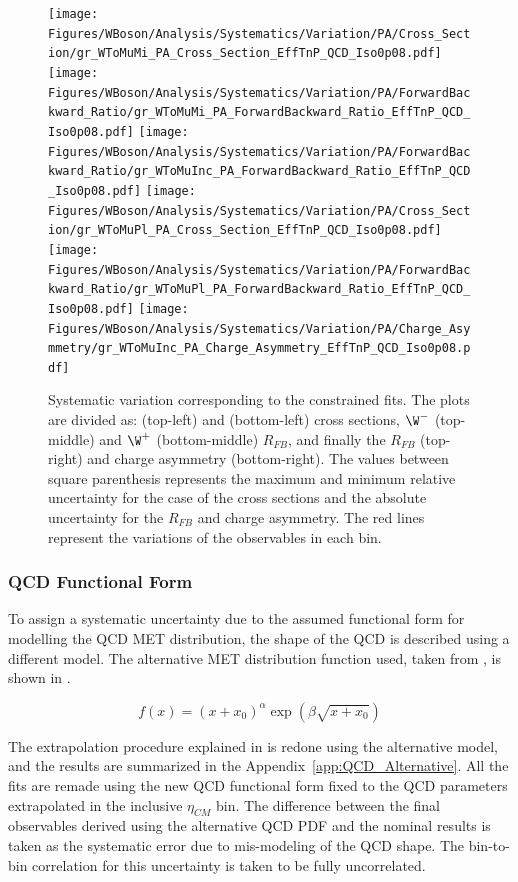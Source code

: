 \begin{figure}[htbp]
 \begin{center}
  \texttt{[image: Figures/WBoson/Analysis/Systematics/Variation/PA/Cross\_Section/gr\_WToMuMi\_PA\_Cross\_Section\_EffTnP\_QCD\_Iso0p08.pdf]}
  \texttt{[image: Figures/WBoson/Analysis/Systematics/Variation/PA/ForwardBackward\_Ratio/gr\_WToMuMi\_PA\_ForwardBackward\_Ratio\_EffTnP\_QCD\_Iso0p08.pdf]}
  \texttt{[image: Figures/WBoson/Analysis/Systematics/Variation/PA/ForwardBackward\_Ratio/gr\_WToMuInc\_PA\_ForwardBackward\_Ratio\_EffTnP\_QCD\_Iso0p08.pdf]}
  \texttt{[image: Figures/WBoson/Analysis/Systematics/Variation/PA/Cross\_Section/gr\_WToMuPl\_PA\_Cross\_Section\_EffTnP\_QCD\_Iso0p08.pdf]}
  \texttt{[image: Figures/WBoson/Analysis/Systematics/Variation/PA/ForwardBackward\_Ratio/gr\_WToMuPl\_PA\_ForwardBackward\_Ratio\_EffTnP\_QCD\_Iso0p08.pdf]}
  \texttt{[image: Figures/WBoson/Analysis/Systematics/Variation/PA/Charge\_Asymmetry/gr\_WToMuInc\_PA\_Charge\_Asymmetry\_EffTnP\_QCD\_Iso0p08.pdf]}
 \end{center}
 \caption{Systematic variation corresponding to the constrained fits. The plots are divided as: \WToMuNuMi (top-left) and \WToMuNuPl (bottom-left) cross sections, $\W^{-}$ (top-middle) and $\W^{+}$ (bottom-middle) $R_{FB}$, and finally the \W $R_{FB}$ (top-right) and \W charge asymmetry (bottom-right). The values between square parenthesis represents the maximum and minimum relative uncertainty for the case of the cross sections and the absolute uncertainty for the $R_{FB}$ and charge asymmetry. The red lines represent the variations of the observables in each bin.}
 \label{fig:Systematic_QCD_Iso0p08}
\end{figure}

\clearpage
\subsubsection{QCD Functional Form}

To assign a systematic uncertainty due to the assumed functional form for modelling the QCD MET distribution, the shape of the QCD is described using a different model. The alternative MET distribution function used, taken from \cite{HIN-13-007}, is shown in . 

\begin{equation}\label{eq:QCDMultiJet}
f(x) = (x+x_0)^\alpha \exp(\beta\sqrt{x+x_0})
\end{equation}

The extrapolation procedure explained in  is redone using the alternative model, and the results are summarized in the Appendix~\ref{app:QCD_Alternative}. All the fits are remade using the new QCD functional form fixed to the QCD parameters extrapolated in the inclusive $\eta_{CM}$ bin. The difference between the final observables derived using the alternative QCD PDF and the nominal results is taken as the systematic error due to mis-modeling of the QCD shape. The bin-to-bin correlation for this uncertainty is taken to be fully uncorrelated.

